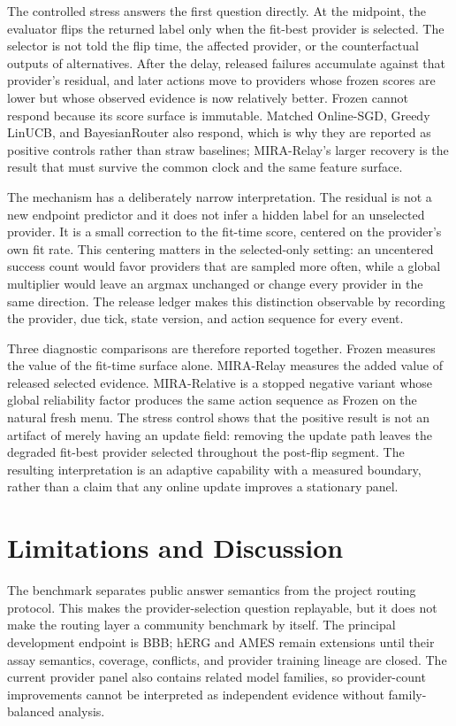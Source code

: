 \documentclass[sigconf,anonymous]{aamas}
\begin{document}
The controlled stress answers the first question directly. At the midpoint, the evaluator flips the returned label only when the fit-best provider is selected. The selector is not told the flip time, the affected provider, or the counterfactual outputs of alternatives. After the delay, released failures accumulate against that provider's residual, and later actions move to providers whose frozen scores are lower but whose observed evidence is now relatively better. Frozen cannot respond because its score surface is immutable. Matched Online-SGD, Greedy LinUCB, and BayesianRouter also respond, which is why they are reported as positive controls rather than straw baselines; MIRA-Relay's larger recovery is the result that must survive the common clock and the same feature surface.

The mechanism has a deliberately narrow interpretation. The residual is not a new endpoint predictor and it does not infer a hidden label for an unselected provider. It is a small correction to the fit-time score, centered on the provider's own fit rate. This centering matters in the selected-only setting: an uncentered success count would favor providers that are sampled more often, while a global multiplier would leave an argmax unchanged or change every provider in the same direction. The release ledger makes this distinction observable by recording the provider, due tick, state version, and action sequence for every event.

Three diagnostic comparisons are therefore reported together. Frozen measures the value of the fit-time surface alone. MIRA-Relay measures the added value of released selected evidence. MIRA-Relative is a stopped negative variant whose global reliability factor produces the same action sequence as Frozen on the natural fresh menu. The stress control shows that the positive result is not an artifact of merely having an update field: removing the update path leaves the degraded fit-best provider selected throughout the post-flip segment. The resulting interpretation is an adaptive capability with a measured boundary, rather than a claim that any online update improves a stationary panel.

\section{Limitations and Discussion}
The benchmark separates public answer semantics from the project routing protocol. This makes the provider-selection question replayable, but it does not make the routing layer a community benchmark by itself. The principal development endpoint is BBB; hERG and AMES remain extensions until their assay semantics, coverage, conflicts, and provider training lineage are closed. The current provider panel also contains related model families, so provider-count improvements cannot be interpreted as independent evidence without family-balanced analysis.
\end{document}
